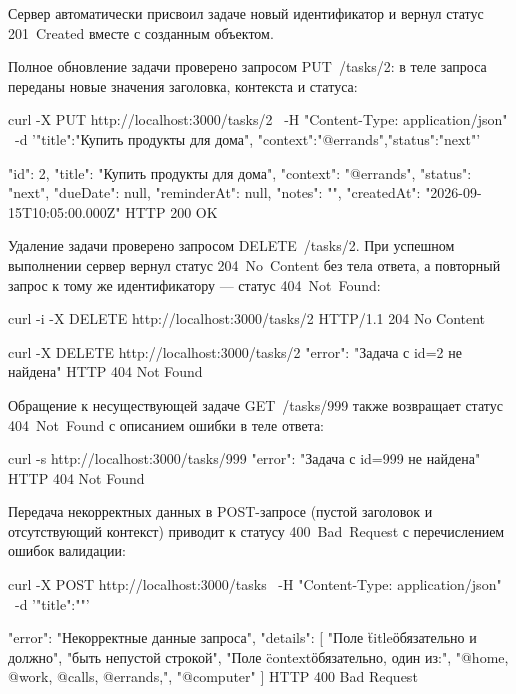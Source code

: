 \documentclass{stp}
\begin{document}
Сервер автоматически присвоил задаче новый идентификатор и вернул
статус 201~Created вместе с созданным объектом.

Полное обновление задачи проверено запросом PUT~/tasks/2: в
теле запроса переданы новые значения заголовка, контекста и статуса:

\begin{stplisting}
curl -X PUT http://localhost:3000/tasks/2 \
  -H "Content-Type: application/json" \
  -d '{"title":"Купить продукты для дома",
       "context":"@errands","status":"next"}'

{
  "id": 2,
  "title": "Купить продукты для дома",
  "context": "@errands",
  "status": "next",
  "dueDate": null,
  "reminderAt": null,
  "notes": "",
  "createdAt": "2026-09-15T10:05:00.000Z"
}
                                 HTTP 200 OK
\end{stplisting}

Удаление задачи проверено запросом DELETE~/tasks/2. При
успешном выполнении сервер вернул статус 204~No~Content без тела
ответа, а повторный запрос к тому же идентификатору — статус
404~Not~Found:

\begin{stplisting}
curl -i -X DELETE http://localhost:3000/tasks/2
HTTP/1.1 204 No Content

curl -X DELETE http://localhost:3000/tasks/2
{
  "error": "Задача с id=2 не найдена"
}
                            HTTP 404 Not Found
\end{stplisting}

Обращение к несуществующей задаче GET~/tasks/999 также
возвращает статус 404~Not~Found с описанием ошибки в теле ответа:

\begin{stplisting}
curl -s http://localhost:3000/tasks/999
{
  "error": "Задача с id=999 не найдена"
}
                            HTTP 404 Not Found
\end{stplisting}

Передача некорректных данных в POST-запросе (пустой заголовок и
отсутствующий контекст) приводит к статусу 400~Bad~Request с
перечислением ошибок валидации:

\begin{stplisting}
curl -X POST http://localhost:3000/tasks \
  -H "Content-Type: application/json" \
  -d '{"title":""}'

{
  "error": "Некорректные данные запроса",
  "details": [
    "Поле \"title\" обязательно и должно",
    "быть непустой строкой",
    "Поле \"context\" обязательно, один из:",
    "@home, @work, @calls, @errands,",
    "@computer"
  ]
}
                             HTTP 400 Bad Request
\end{stplisting}
\end{document}
